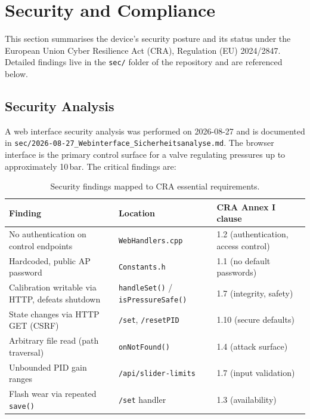 
\section{Security and Compliance}
\label{sec:security-compliance}

This section summarises the device's security posture and its status under the
European Union Cyber Resilience Act (CRA), Regulation (EU) 2024/2847. Detailed
findings live in the \texttt{sec/} folder of the repository and are referenced below.

\subsection{Security Analysis}

A web interface security analysis was performed on 2026-08-27 and is documented in
\texttt{sec/2026-08-27\_Webinterface\_Sicherheitsanalyse.md}. The browser interface
is the primary control surface for a valve regulating pressures up to approximately
10\,bar. The critical findings are:

\begin{table}[H]
\centering
\begin{tabular}{@{}lll@{}}
\toprule
\textbf{Finding} & \textbf{Location} & \textbf{CRA Annex I clause} \\
\midrule
No authentication on control endpoints & \texttt{WebHandlers.cpp} & 1.2 (authentication, access control) \\
Hardcoded, public AP password & \texttt{Constants.h} & 1.1 (no default passwords) \\
Calibration writable via HTTP, defeats shutdown & \texttt{handleSet()} / \texttt{isPressureSafe()} & 1.7 (integrity, safety) \\
State changes via HTTP GET (CSRF) & \texttt{/set}, \texttt{/resetPID} & 1.10 (secure defaults) \\
Arbitrary file read (path traversal) & \texttt{onNotFound()} & 1.4 (attack surface) \\
Unbounded PID gain ranges & \texttt{/api/slider-limits} & 1.7 (input validation) \\
Flash wear via repeated \texttt{save()} & \texttt{/set} handler & 1.3 (availability) \\
\bottomrule
\end{tabular}
\caption{Security findings mapped to CRA essential requirements.}
\end{table}

